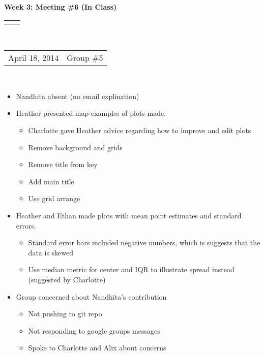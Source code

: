 \documentclass[12pt]{article}
\renewcommand{\title}[1]{\textbf{#1}\\}
\renewcommand{\line}{\begin{tabularx}{\textwidth}{X>{\raggedleft}X}\hline\\\end{tabularx}\\[-0.5cm]}
\newcommand{\leftright}[2]{\begin{tabularx}{\textwidth}{X>{\raggedleft}X}#1%
& #2\\\end{tabularx}\\[-0.5cm]}
\begin{document}
\title{Week 3: Meeting \#6 (In Class)}
\line
\leftright{April 18, 2014}{Group \#5} %
\vspace{5mm}


\begin{itemize}
\item Nandhita absent (no email explination)
\item Heather presented map examples of plots made.
\begin{itemize}
\item Charlotte gave Heather advice regarding how to improve and edit plots
\item Remove background and grids
\item Remove title from key 
\item Add main title 
\item Use grid arrange 
\end{itemize}
\item Heather and Ethan made plots with mean point estimates and standard errors.  
\begin{itemize}
\item Standard error bars included negative numbers, which is suggests that the data is skewed 
\item Use median metric for center and IQR to illustrate spread instead (suggested by Charlotte)
\end{itemize}
\item Group concerned about Nandhita's contribution 
\begin{itemize}
\item Not pushing to git repo 
\item Not responding to google groups messages 
\item Spoke to Charlotte and Alix about concerns 
\end{itemize}
\end{itemize}





\end{document}
